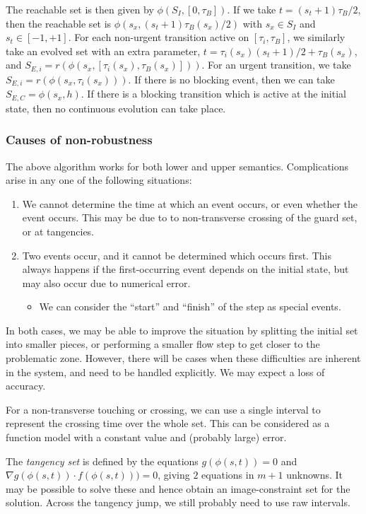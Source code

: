 \documentclass[english,a4paper]{article}
\theoremstyle{theorem}
\theoremstyle{definition}
\theoremstyle{remark}
\begin{document}
The reachable set is then given by $\phi(S_I,[0,\tau_B])$. If we take $t=(s_t+1)\tau_B/2$, then the reachable set is $\phi(s_x,(s_t+1)\tau_B(s_x)/2)$ with $s_x\in S_I$ and $s_t\in[-1,+1]$. For each non-urgent transition active on $[\tau_i,\tau_B]$, we similarly take an evolved set with an extra parameter, $t=\tau_i(s_x)(s_t+1)/2+\tau_B(s_x)$, and $S_{E,i}=r(\phi(s_x,[\tau_i(s_x),\tau_B(s_x)]))$. For an urgent transition, we take $S_{E,i}=r(\phi(s_x,\tau_i(s_x)))$. If there is no blocking event, then we can take $S_{E,C}=\phi(s_x,h)$.
If there is a blocking transition which is active at the initial state, then no continuous evolution can take place.

\subsubsection*{Causes of non-robustness}
The above algorithm works for both lower and upper semantics. Complications arise in any one of the following situations:
\begin{enumerate}
\item We cannot determine the time at which an event occurs, or even whether the event occurs. This may be due to to non-transverse crossing of the guard set, or at tangencies.
\item Two events occur, and it cannot be determined which occurs first. This always happens if the first-occurring event depends on the initial state, but may also occur due to numerical error.
 \begin{itemize}
  \item We can consider the ``start'' and ``finish'' of the step as special events.
 \end{itemize}
\end{enumerate}

In both cases, we may be able to improve the situation by splitting the initial set into smaller pieces, or performing a smaller flow step to get closer to the problematic zone. However, there will be cases when these difficulties are inherent in the system, and need to be handled explicitly. We may expect a loss of accuracy.

For a non-transverse touching or crossing, we can use a single interval to represent the crossing time over the whole set. This can be considered as a function model with a constant value and (probably large) error.

The \emph{tangency set} is defined by the equations $g(\phi(s,t))=0$ and $\nabla g(\phi(s,t)) \cdot f(\phi(s,t)))=0$, giving $2$ equations in $m+1$ unknowns. It may be possible to solve these and hence obtain an image-constraint set for the solution. Across the tangency jump, we still probably need to use raw intervals.
\end{document}
